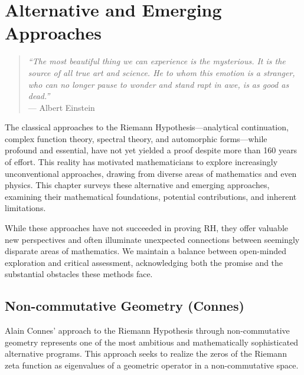 
\chapter{Alternative and Emerging Approaches}
\label{ch:alternative}

\begin{quote}
\textit{``The most beautiful thing we can experience is the mysterious. It is the source of all true art and science. He to whom this emotion is a stranger, who can no longer pause to wonder and stand rapt in awe, is as good as dead.''} \\
--- Albert Einstein
\end{quote}

The classical approaches to the Riemann Hypothesis---analytical continuation, complex function theory, spectral theory, and automorphic forms---while profound and essential, have not yet yielded a proof despite more than 160 years of effort. This reality has motivated mathematicians to explore increasingly unconventional approaches, drawing from diverse areas of mathematics and even physics. This chapter surveys these alternative and emerging approaches, examining their mathematical foundations, potential contributions, and inherent limitations.

While these approaches have not succeeded in proving RH, they offer valuable new perspectives and often illuminate unexpected connections between seemingly disparate areas of mathematics. We maintain a balance between open-minded exploration and critical assessment, acknowledging both the promise and the substantial obstacles these methods face.

\section{Non-commutative Geometry (Connes)}
\label{sec:noncommutative_geometry}

Alain Connes' approach to the Riemann Hypothesis through non-commutative geometry represents one of the most ambitious and mathematically sophisticated alternative programs. This approach seeks to realize the zeros of the Riemann zeta function as eigenvalues of a geometric operator in a non-commutative space.

